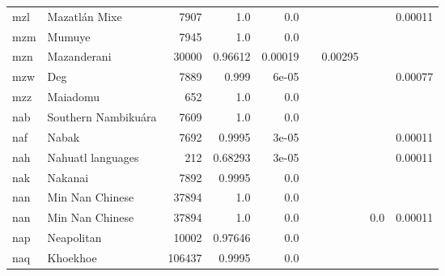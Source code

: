 \documentclass[11pt]{article}
\begin{document}
\begin{table*}[h]
{\begin{tabular}{llrrrrrrr}
mzl         & Mazatlán Mixe         & 7907         & 1.0         & 0.0         &          &          &          & 0.00011         \\

mzm         & Mumuye         & 7945         & 1.0         & 0.0         &          &          &          &          \\

mzn         & Mazanderani         & 30000         & 0.96612         & 0.00019         &          & 0.00295         &          &          \\

mzw         & Deg         & 7889         & 0.999         & 6e-05         &          &          &          & 0.00077         \\

mzz         & Maiadomu         & 652         & 1.0         & 0.0         &          &          &          &          \\

nab         & Southern Nambikuára         & 7609         & 1.0         & 0.0         &          &          &          &          \\

naf         & Nabak         & 7692         & 0.9995         & 3e-05         &          &          &          & 0.00011         \\

nah         & Nahuatl languages         & 212         & 0.68293         & 3e-05         &          &          &          & 0.00011         \\

nak         & Nakanai         & 7892         & 0.9995         & 0.0         &          &          &          &          \\

nan         & Min Nan Chinese         & 37894         & 1.0         & 0.0         &          &          &          &          \\

nan         & Min Nan Chinese         & 37894         & 1.0         & 0.0         &          &          & 0.0         & 0.00011         \\

nap         & Neapolitan         & 10002         & 0.97646         & 0.0         &          &          &          &          \\

naq         & Khoekhoe         & 106437         & 0.9995         & 0.0         &          &          &          &          \\


\end{tabular}}
\end{table*}
\end{document}
